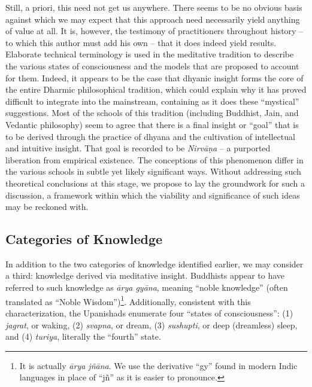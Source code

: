 \documentclass[pra,twocolumn,groupedaddress,10pt]{revtex4}
\theoremstyle{definition}
\begin{document}
Still, a priori, this need not get us anywhere. There seems to be no obvious basis against which we may expect that this approach need necessarily yield anything of value at all. It is, however, the testimony of practitioners throughout history -- to which this author must add his own -- that it does indeed yield results. Elaborate technical terminology is used in the meditative tradition to describe the various states of consciousness and the models that are proposed to account for them. Indeed, it appears to be the case that dhyanic insight forms the core of the entire Dharmic philosophical tradition, which could explain why it has proved difficult to integrate into the mainstream, containing as it does these ``mystical'' suggestions. Most of the schools of this tradition (including Buddhist, Jain, and Vedantic philosophy) seem to agree that there is a final insight or ``goal'' that is to be derived through the practice of dhyana and the cultivation of intellectual and intuitive insight. That goal is recorded to be \emph{Nirv\={a}\d{n}a} -- a purported liberation from empirical existence. The conceptions of this phenomenon differ in the various schools in subtle yet likely significant ways. Without addressing such theoretical conclusions at this stage, we propose to lay the groundwork for such a discussion, a framework within which the viability and significance of such ideas may be reckoned with.

\subsection{Categories of Knowledge} \label{sec:catkno}

In addition to the two categories of knowledge identified earlier, we may consider a third: knowledge derived via meditative insight. Buddhists appear to have referred to such knowledge as \emph{\={a}rya gy\={a}na}\cite{lankavatara}, meaning ``noble knowledge'' (often translated as ``Noble Wisdom'')\footnote{It is actually \emph{\={a}rya j\~{n}\={a}na}. We use the derivative ``gy'' found in modern Indic languages in place of ``j\~{n}'' as it is easier to pronounce.}. Additionally, consistent with this characterization, the Upanishads enumerate four ``states of consciousness'': (1) \emph{jagrat}, or waking, (2) \emph{svapna}, or dream, (3) \emph{sushupti}, or deep (dreamless) sleep, and (4) \emph{turiya}, literally the ``fourth'' state\cite{mandukya}.
\end{document}
